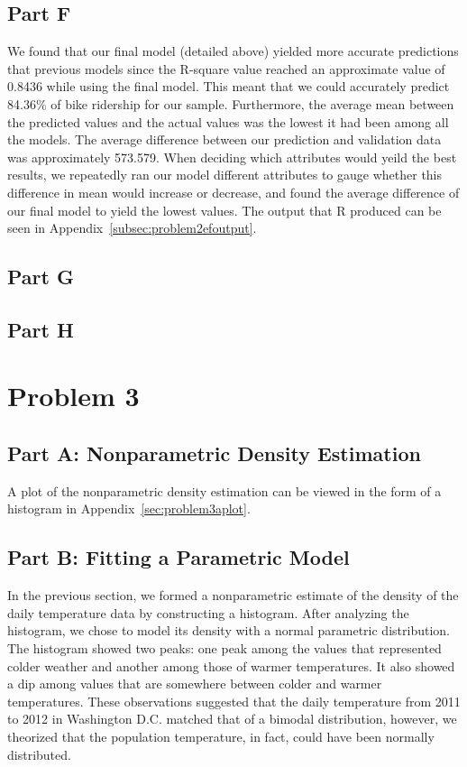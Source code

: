 \documentclass[11pt]{article}
\begin{document}
\subsection{Part F}
\label{subsec:2f}
 We found that our final model (detailed above) yielded more accurate predictions that previous models since the R-square value reached an approximate value of 0.8436 while using the final model. This meant that we could accurately predict 84.36\% of bike ridership for our sample. Furthermore, the average mean between the predicted values and the actual values was the lowest it had been among all the models. The average difference between our prediction and validation data was approximately 573.579. When deciding which attributes would yeild the best results, we repeatedly ran our model different attributes to gauge whether this difference in mean would increase or decrease, and found the average difference of our final model to yield the lowest values. The output that R produced can be seen in Appendix~\ref{subsec:problem2efoutput}.

\subsection{Part G}
\label{subsec:2g}

\subsection{Part H}
\label{subsec:2h}
\pagebreak

\section{Problem 3}
\label{sec:problem3}
\subsection{Part A: Nonparametric Density Estimation}
\label{subsec:3a}
A plot of the nonparametric density estimation can be viewed in the form of a histogram in Appendix~\ref{sec:problem3aplot}.

\subsection{Part B: Fitting a Parametric Model}
\label{subsec:3b}
In the previous section, we formed a nonparametric estimate of the density of the daily temperature data by constructing a histogram. After analyzing the histogram, we chose to model its density with a normal parametric distribution. The histogram showed two peaks: one peak among the values that represented colder weather and another among those of warmer temperatures. It also showed a dip among values that are somewhere between colder and warmer temperatures. These observations suggested that the daily temperature from 2011 to 2012 in Washington D.C. matched that of a bimodal distribution, however, we theorized that the population temperature, in fact, could have been normally distributed.  
\end{document}
